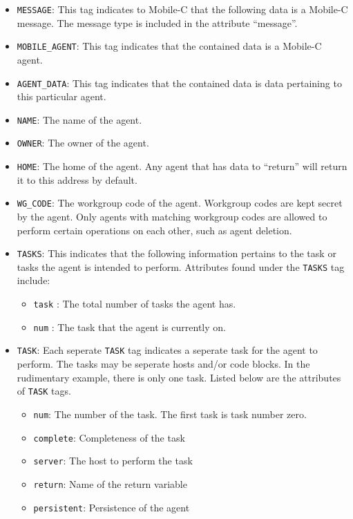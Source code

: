 \documentclass[11pt]{report}
\begin{document}
\begin{itemize}
\item \texttt{MESSAGE}: This tag indicates to Mobile-C that the following data
  is a Mobile-C message. The message type is included in the attribute
  ``message''.
\item \texttt{MOBILE\_AGENT}: This tag indicates that the contained data is a 
  Mobile-C agent.
\item \texttt{AGENT\_DATA}: This tag indicates that the contained data is data pertaining
  to this particular agent.
\item \texttt{NAME}: The name of the agent.
\item \texttt{OWNER}: The owner of the agent. 
\item \texttt{HOME}: The home of the agent. Any agent that has data to ``return'' will
	return it to this address by default.
\item \texttt{WG\_CODE}: The workgroup code of the agent. Workgroup codes are
kept secret by the agent. Only agents with matching workgroup codes are allowed
to perform certain operations on each other, such as agent deletion.
\item \texttt{TASKS}: This indicates that the following information pertains to the
  task or tasks the agent is intended to perform. Attributes found under the
  \texttt{TASKS} tag include:
  \begin{itemize}
    \item \texttt{task} : The total number of tasks the agent has.
    \item \texttt{num} : The task that the agent is currently on.
  \end{itemize}
\item \texttt{TASK}: Each seperate \texttt{TASK} tag indicates a seperate task for the agent
  to perform. The tasks may be seperate hosts and/or code blocks. In the
  rudimentary example, there is only one task. Listed below are the attributes of 
  \texttt{TASK} tags.
  \begin{itemize}
  \item \texttt{num}:           The number of the task. The first task is task number zero.
  \item \texttt{complete}:      Completeness of the task
  \item \texttt{server}:        The host to perform the task
  \item \texttt{return}:        Name of the return variable
  \item \texttt{persistent}:    Persistence of the agent

\end{itemize}
\end{itemize}
\end{document}
